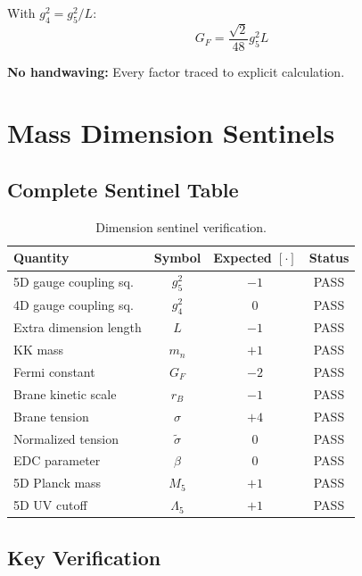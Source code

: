 \documentclass[11pt,a4paper]{article}
\begin{document}
With $g_4^2 = g_5^2/L$:
\begin{equation}
\label{eq:48-final}
G_F = \frac{\sqrt{2}}{48} g_5^2 L
\end{equation}

\textbf{No handwaving:} Every factor traced to explicit calculation.

\section{Mass Dimension Sentinels}
\label{sec:dim-sentinels}

\subsection{Complete Sentinel Table}
\label{subsec:sentinel-table}

\begin{table}[ht]
\centering
\caption{Dimension sentinel verification.}
\label{tab:dim-sentinel-full}
\begin{tabular}{lccc}
\toprule
Quantity & Symbol & Expected $[\cdot]$ & Status \\
\midrule
5D gauge coupling sq. & $g_5^2$ & $-1$ & PASS \\
4D gauge coupling sq. & $g_4^2$ & $0$ & PASS \\
Extra dimension length & $L$ & $-1$ & PASS \\
KK mass & $m_n$ & $+1$ & PASS \\
Fermi constant & $G_F$ & $-2$ & PASS \\
Brane kinetic scale & $r_B$ & $-1$ & PASS \\
Brane tension & $\sigma$ & $+4$ & PASS \\
Normalized tension & $\tilde{\sigma}$ & $0$ & PASS \\
EDC parameter & $\beta$ & $0$ & PASS \\
5D Planck mass & $M_5$ & $+1$ & PASS \\
5D UV cutoff & $\Lambda_5$ & $+1$ & PASS \\
\bottomrule
\end{tabular}
\end{table}

\subsection{Key Verification}
\label{subsec:key-verification}
\end{document}
